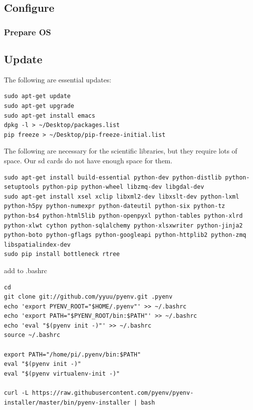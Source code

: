 \subsection{Configure}\label{configure}

\subsubsection{Prepare OS}\label{prepare-os}

\subsection{Update}\label{update}

The following are essential updates:

\begin{verbatim}
sudo apt-get update
sudo apt-get upgrade
sudo apt-get install emacs
dpkg -l > ~/Desktop/packages.list
pip freeze > ~/Desktop/pip-freeze-initial.list
\end{verbatim}

The following are necessary for the scientific libraries, but they
require lots of space. Our sd cards do not have enough space for them.

\begin{verbatim}
sudo apt-get install build-essential python-dev python-distlib python-setuptools python-pip python-wheel libzmq-dev libgdal-dev
sudo apt-get install xsel xclip libxml2-dev libxslt-dev python-lxml python-h5py python-numexpr python-dateutil python-six python-tz python-bs4 python-html5lib python-openpyxl python-tables python-xlrd python-xlwt cython python-sqlalchemy python-xlsxwriter python-jinja2 python-boto python-gflags python-googleapi python-httplib2 python-zmq libspatialindex-dev
sudo pip install bottleneck rtree
\end{verbatim}

add to .bashrc

\begin{verbatim}
cd
git clone git://github.com/yyuu/pyenv.git .pyenv
echo 'export PYENV_ROOT="$HOME/.pyenv"' >> ~/.bashrc
echo 'export PATH="$PYENV_ROOT/bin:$PATH"' >> ~/.bashrc
echo 'eval "$(pyenv init -)"' >> ~/.bashrc
source ~/.bashrc

export PATH="/home/pi/.pyenv/bin:$PATH"
eval "$(pyenv init -)"
eval "$(pyenv virtualenv-init -)"

curl -L https://raw.githubusercontent.com/pyenv/pyenv-installer/master/bin/pyenv-installer | bash
\end{verbatim}

